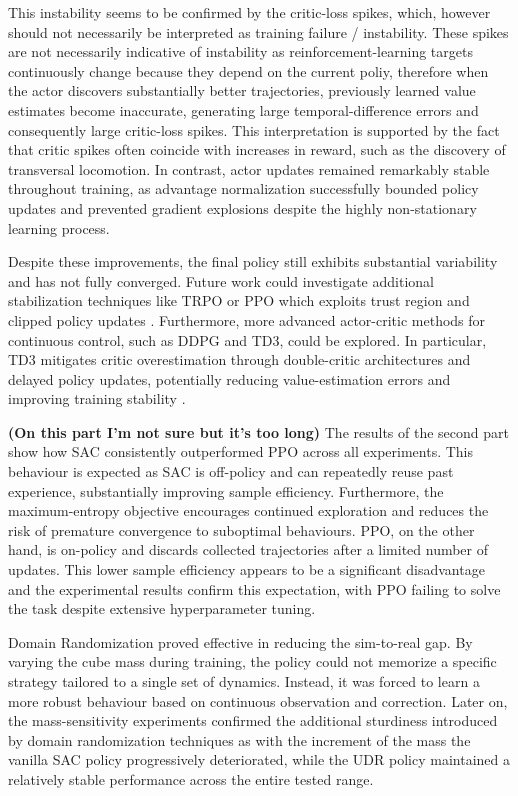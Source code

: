 This instability seems to be confirmed by the critic-loss spikes, which, however should not necessarily be interpreted as training failure / instability. These spikes are not necessarily indicative of instability as reinforcement-learning targets continuously change because they depend on the current poliy, therefore when the actor discovers substantially better trajectories, previously learned value estimates become inaccurate, generating large temporal-difference errors and consequently large critic-loss spikes. This interpretation is supported by the fact that critic spikes often coincide with increases in reward, such as the discovery of transversal locomotion. In contrast, actor updates remained remarkably stable throughout training, as advantage normalization successfully bounded policy updates and prevented gradient explosions despite the highly non-stationary learning process.

Despite these improvements, the final policy still exhibits substantial variability and has not fully converged. Future work could investigate additional stabilization techniques like TRPO or PPO which exploits trust region and clipped policy updates \cite{schulman2017}.
Furthermore, more advanced actor-critic methods for continuous control, such as DDPG and TD3, could be explored. In particular, TD3 mitigates critic overestimation through double-critic architectures and delayed policy updates, potentially reducing value-estimation errors and improving training stability \cite{fujimoto2018}.


\textbf{(On this part I'm not sure but it's too long)}
The results of the second part show how SAC consistently outperformed PPO across all experiments. This behaviour is expected as SAC is off-policy and can repeatedly reuse past experience, substantially improving sample efficiency. Furthermore, the maximum-entropy objective encourages continued exploration and reduces the risk of premature convergence to suboptimal behaviours. PPO, on the other hand, is on-policy and discards collected trajectories after a limited number of updates. This lower sample efficiency appears to be a significant disadvantage and the experimental results confirm this expectation, with PPO failing to solve the task despite extensive hyperparameter tuning.

Domain Randomization proved effective in reducing the sim-to-real gap. By varying the cube mass during training, the policy could not memorize a specific strategy tailored to a single set of dynamics. Instead, it was forced to learn a more robust behaviour based on continuous observation and correction. Later on, the mass-sensitivity experiments confirmed the additional sturdiness introduced by domain randomization techniques as with the increment of the mass the vanilla SAC policy progressively deteriorated, while the UDR policy maintained a relatively stable performance across the entire tested range.

